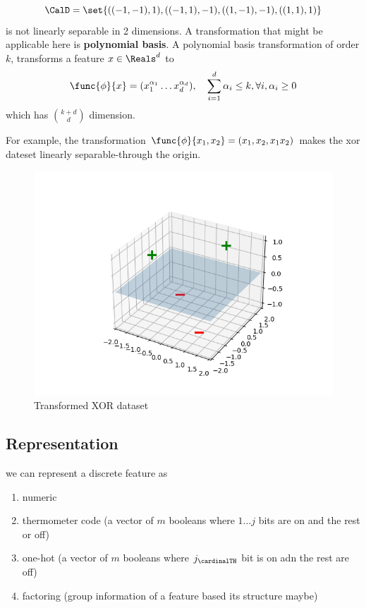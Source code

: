 \begin{equation*}
    \CalD = \set{((-1,-1),1), ((-1,1), -1) , ((1,-1),-1) , ((1,1),1)}
\end{equation*}
is not linearly separable in 2 dimensions. A transformation that might be applicable here is \textbf{polynomial basis}. A polynomial basis transformation of order \(k\), transforms a feature \(x \in \Reals^d\) to
\begin{equation*}
    \func{\phi}{x} = ( x_1^{\alpha_1} \dots x_d^{\alpha_d}) , \quad \sum_{i = 1}^d \alpha_i \leq k , \forall i, \alpha_i \geq 0
\end{equation*}
which has \(\binom{k + d }{d }\) dimension.

For example, the transformation \(\func{\phi}{x_1, x_2} = (x_1,x_2,x_1x_2)\) makes the xor dateset linearly separable-through the origin.
\begin{figure}[!ht]
    \centering
    \includegraphics{Chapters/graphics/xor_3d.png}
    \caption{Transformed XOR dataset}
\end{figure}
\subsection{Representation}
we can represent a discrete feature as
\begin{enumerate}
    \item numeric
    \item thermometer code (a vector of \(m\) booleans where \(1\dots j\) bits are on and the rest or off)
    \item one-hot (a vector of \(m\) booleans where \(j_{\cardinalTH}\) bit is on adn the rest are off)
    \item factoring (group information of a feature based its structure maybe)
\end{enumerate}

